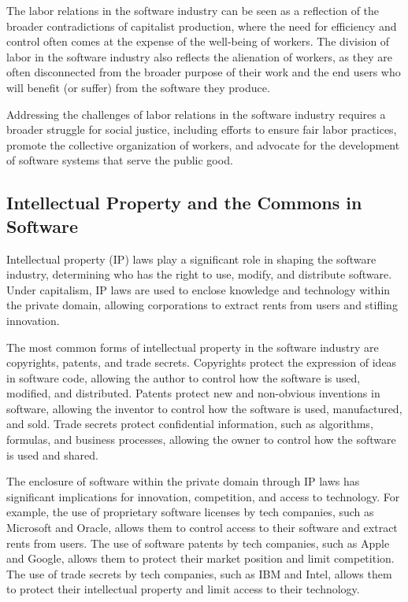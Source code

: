 \begin{refsection}
\begin{multicols}{2}
{The labor relations in the software industry can be seen as a reflection of the broader contradictions of capitalist production, where the need for efficiency and control often comes at the expense of the well-being of workers. The division of labor in the software industry also reflects the alienation of workers, as they are often disconnected from the broader purpose of their work and the end users who will benefit (or suffer) from the software they produce.

Addressing the challenges of labor relations in the software industry requires a broader struggle for social justice, including efforts to ensure fair labor practices, promote the collective organization of workers, and advocate for the development of software systems that serve the public good.

\subsection{Intellectual Property and the Commons in Software}

Intellectual property (IP) laws play a significant role in shaping the software industry, determining who has the right to use, modify, and distribute software. Under capitalism, IP laws are used to enclose knowledge and technology within the private domain, allowing corporations to extract rents from users and stifling innovation.

The most common forms of intellectual property in the software industry are copyrights, patents, and trade secrets. Copyrights protect the expression of ideas in software code, allowing the author to control how the software is used, modified, and distributed. Patents protect new and non-obvious inventions in software, allowing the inventor to control how the software is used, manufactured, and sold. Trade secrets protect confidential information, such as algorithms, formulas, and business processes, allowing the owner to control how the software is used and shared.

The enclosure of software within the private domain through IP laws has significant implications for innovation, competition, and access to technology. For example, the use of proprietary software licenses by tech companies, such as Microsoft and Oracle, allows them to control access to their software and extract rents from users. The use of software patents by tech companies, such as Apple and Google, allows them to protect their market position and limit competition. The use of trade secrets by tech companies, such as IBM and Intel, allows them to protect their intellectual property and limit access to their technology.

}
\end{multicols}
\end{refsection}

